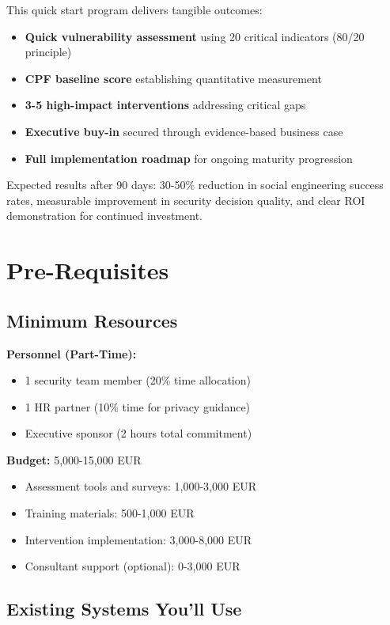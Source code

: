 \documentclass[11pt,a4paper]{article}
\begin{document}
This quick start program delivers tangible outcomes:

\begin{itemize}
\item \textbf{Quick vulnerability assessment} using 20 critical indicators (80/20 principle)
\item \textbf{CPF baseline score} establishing quantitative measurement
\item \textbf{3-5 high-impact interventions} addressing critical gaps
\item \textbf{Executive buy-in} secured through evidence-based business case
\item \textbf{Full implementation roadmap} for ongoing maturity progression
\end{itemize}

Expected results after 90 days: 30-50\% reduction in social engineering success rates, measurable improvement in security decision quality, and clear ROI demonstration for continued investment.

\section{Pre-Requisites}

\subsection{Minimum Resources}

\textbf{Personnel (Part-Time):}
\begin{itemize}
\item 1 security team member (20\% time allocation)
\item 1 HR partner (10\% time for privacy guidance)
\item Executive sponsor (2 hours total commitment)
\end{itemize}

\textbf{Budget:} 5,000-15,000 EUR
\begin{itemize}
\item Assessment tools and surveys: 1,000-3,000 EUR
\item Training materials: 500-1,000 EUR
\item Intervention implementation: 3,000-8,000 EUR
\item Consultant support (optional): 0-3,000 EUR
\end{itemize}

\subsection{Existing Systems You'll Use}
\end{document}
